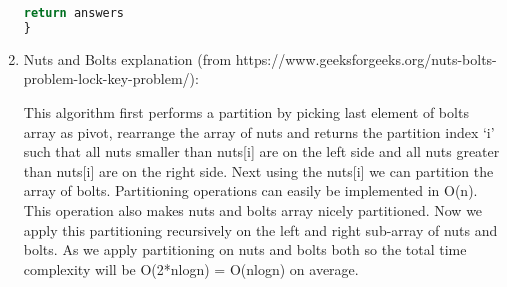 \documentclass{article}
\begin{document}
\begin{enumerate}
\begin{lstlisting}[language=python]
    return answers
}
	      \end{lstlisting}
	      
	\item Nuts and Bolts explanation (from https://www.geeksforgeeks.org/nuts-bolts-problem-lock-key-problem/):
	      
	      This algorithm first performs a partition by picking last element of bolts array as pivot, rearrange the array of nuts and returns the partition index ‘i’ such that all nuts smaller than nuts[i] are on the left side and all nuts greater than nuts[i] are on the right side. Next using the nuts[i] we can partition the array of bolts. Partitioning operations can easily be implemented in O(n). This operation also makes nuts and bolts array nicely partitioned. Now we apply this partitioning recursively on the left and right sub-array of nuts and bolts. As we apply partitioning on nuts and bolts both so the total time complexity will be O(2*nlogn) = O(nlogn) on average.
	      
\end{enumerate}
\end{document}
